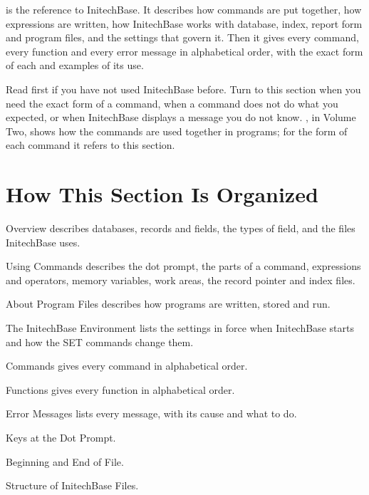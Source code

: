  is the reference to InitechBase.  It describes
how commands are put together, how expressions are written, how InitechBase
works with database, index, report form and program files, and the settings
that govern it.  Then it gives every command, every function and every error
message in alphabetical order, with the exact form of each and examples of
its use.

Read  first if you have not used InitechBase
before.  Turn to this section when you need the exact form of a command, when
a command does not do what you expected, or when InitechBase displays a
message you do not know.  , in Volume
Two, shows how the commands are used together in programs; for the form of each
command it refers to this section.

\section{How This Section Is Organized}
Overview describes databases, records and fields, the
types of field, and the files InitechBase uses.

Using Commands describes the dot prompt, the parts of a
command, expressions and operators, memory variables, work areas, the record
pointer and index files.

About Program Files describes how programs are written,
stored and run.

The InitechBase Environment lists the settings in force
when InitechBase starts and how the SET commands change them.

Commands gives every command in alphabetical order.

Functions gives every function in alphabetical order.

Error Messages lists every message, with its cause and
what to do.

Keys at the Dot Prompt.

Beginning and End of File.

Structure of InitechBase Files.

